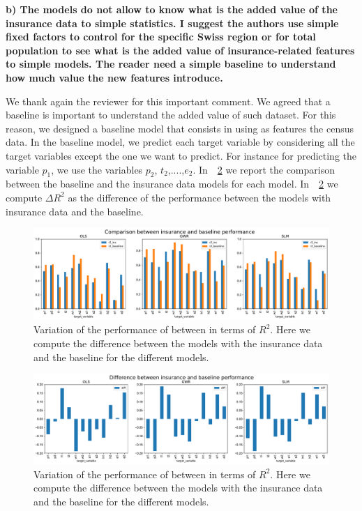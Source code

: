 \documentclass[12pt]{article}
\begin{document}
\vspace{1cm}
\textbf{b) The models do not allow to know what is the added value of the insurance data to simple statistics. I suggest the authors use simple fixed factors to control for the specific Swiss region or for total population to see what is the added value of insurance-related features to simple models. The reader need a simple baseline to understand how much value the new features introduce.}

We thank again the reviewer for this important comment. We agreed that a baseline is important to understand the added value of such dataset. For this reason, we designed a baseline model that consists in using as features the census data. In the baseline model, we predict each target variable by considering all the target variables except the one we want to predict. For instance for predicting the variable $p_1$, we use the variables $p_2$, $t_2$,....,$e_2$.  In~\figurename~\ref{fig:deltaPer} we report the comparison between the baseline and the insurance data models for each model. In~\figurename~\ref{fig:deltaPer} we compute $\Delta R^2$ as the difference of the performance between the models with insurance data and the baseline. 

\begin{figure}[h!]
    \centering
    \includegraphics[width=1\linewidth]{figures/comparison0.pdf}
\caption{Variation of the performance of between in terms of $R^2$. Here we compute the difference between the models with the insurance data and the baseline for the different models.}
\label{fig:baseline}  
\end{figure}


\begin{figure}[h!]
    \centering
    \includegraphics[width=1\linewidth]{figures/comparison.pdf}
\caption{Variation of the performance of between in terms of $R^2$. Here we compute the difference between the models with the insurance data and the baseline for the different models.}
\label{fig:deltaPer}  
\end{figure}
\end{document}
